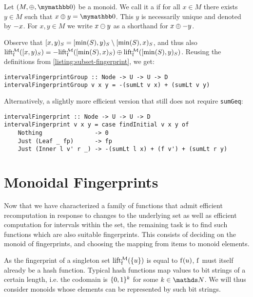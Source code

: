 \begin{definition}
Let $(M, \groupaddsym, \neutraladd)$ be a monoid.
We call it a  if for all $x \in M$ there exists $y \in M$ such that $\groupadd{x}{y} = \neutraladd$.
This $y$ is necessarily unique and denoted by $-{x}$.
For $x, y \in M$ we write ${x} \ominus {y}$ as a shorthand for ${x} \oplus {-{y}}$.
\end{definition}

Observe that $[{x},{y})_{S} = [{\min(S)},{y})_{S} \setminus [{\min(S)},{x})_{S}$, and thus also $\operatorname{lift_{\operatorname{f}}^{\mathcal{M}}}([{x},{y})_{S}) = {-{\operatorname{lift_{\operatorname{f}}^{\mathcal{M}}}([{\min(S)},{x})_{S})}} \oplus {\operatorname{lift_{\operatorname{f}}^{\mathcal{M}}}([{\min(S)},{y})_{S})}$. Reusing the definitions from \cref{listing:subset-fingerprint}, we get:

\begin{verbatim}
intervalFingerprintGroup :: Node -> U -> U -> D
intervalFingerprintGroup v x y = -(sumLt v x) + (sumLt v y)
\end{verbatim}

Alternatively, a slightly more efficient version that still does not require \texttt{sumGeq}:

\begin{verbatim}
intervalFingerprint :: Node -> U -> U -> D
intervalFingerprint v x y = case findInitial v x y of
    Nothing               -> 0
    Just (Leaf _ fp)      -> fp
    Just (Inner l v' r _) -> -(sumLt l x) + (f v') + (sumLt r y)
\end{verbatim}

\section{Monoidal Fingerprints}
\label{collisions}

Now that we have characterized a family of functions that admit efficient recomputation in response to changes to the underlying set as well as efficient computation for intervals within the set, the remaining task is to find such functions which are also suitable fingerprints. This consists of deciding on the monoid of fingerprints, and choosing the mapping from items to monoid elements.

As the fingerprint of a singleton set $\operatorname{lift_{\operatorname{f}}^{\mathcal{M}}}(\{u\})$ is equal to $\operatorname{f}(u)$, $\operatorname{f}$ must itself already be a hash function. Typical hash functions map values to bit strings of a certain length, i.e. the codomain is $\{0, 1\}^k$ for some $k \in \N$. We will thus consider monoids whose elements can be represented by such bit strings.

